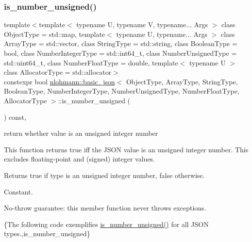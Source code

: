 \subsubsection{\texorpdfstring{is\+\_\+number\+\_\+unsigned()}{is\_number\_unsigned()}}
{\footnotesize\ttfamily template$<$template$<$ typename U, typename V, typename... Args $>$ class Object\+Type = std\+::map, template$<$ typename U, typename... Args $>$ class Array\+Type = std\+::vector, class String\+Type  = std\+::string, class Boolean\+Type  = bool, class Number\+Integer\+Type  = std\+::int64\+\_\+t, class Number\+Unsigned\+Type  = std\+::uint64\+\_\+t, class Number\+Float\+Type  = double, template$<$ typename U $>$ class Allocator\+Type = std\+::allocator$>$ \\
constexpr bool \hyperlink{classnlohmann_1_1basic__json}{nlohmann\+::basic\+\_\+json}$<$ Object\+Type, Array\+Type, String\+Type, Boolean\+Type, Number\+Integer\+Type, Number\+Unsigned\+Type, Number\+Float\+Type, Allocator\+Type $>$\+::is\+\_\+number\+\_\+unsigned (\begin{DoxyParamCaption}{ }\end{DoxyParamCaption}) const\hspace{0.3cm}{\ttfamily [inline]}, {\ttfamily [noexcept]}}



return whether value is an unsigned integer number 

This function returns true iff the J\+S\+ON value is an unsigned integer number. This excludes floating-\/point and (signed) integer values.

\begin{DoxyReturn}{Returns}
{\ttfamily true} if type is an unsigned integer number, {\ttfamily false} otherwise.
\end{DoxyReturn}
Constant.

No-\/throw guarantee\+: this member function never throws exceptions.

\{The following code exemplifies {\ttfamily \hyperlink{classnlohmann_1_1basic__json_aa388dc101bc285a98122a38fd2e3a9db}{is\+\_\+number\+\_\+unsigned()}} for all J\+S\+ON types.,is\+\_\+number\+\_\+unsigned\}

